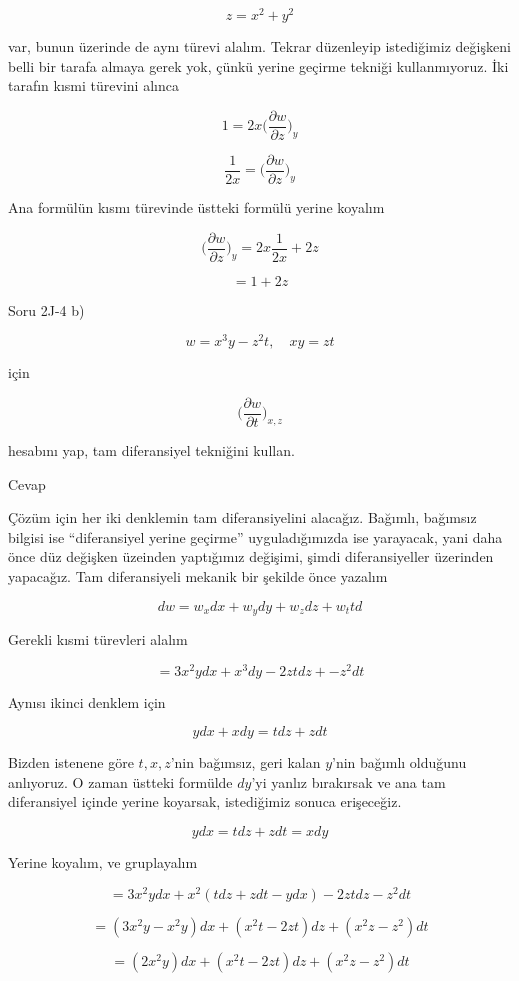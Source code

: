 \documentclass[12pt,fleqn]{article}\usepackage{../../common}
\begin{document}
$$ z = x^2 + y^2 $$

var, bunun üzerinde de aynı türevi alalım. Tekrar düzenleyip istediğimiz
değişkeni belli bir tarafa almaya gerek yok, çünkü yerine geçirme tekniği
kullanmıyoruz. İki tarafın kısmi türevini alınca

$$ 1 = 2x  \bigg( \frac{\partial w}{\partial z}  \bigg)_y  $$

$$ \frac{ 1}{2x}  = \bigg( \frac{\partial w}{\partial z}  \bigg)_y  $$

Ana formülün kısmı türevinde üstteki formülü yerine koyalım

$$
\bigg( \frac{\partial w}{\partial z}  \bigg)_y  =
2x  \frac{1}{2x}  + 2z
$$

$$   =
1 + 2z
$$

Soru 2J-4 b)

$$ w = x^3y - z^2t, \quad xy = zt$$

için

$$ \bigg( \frac{\partial w}{\partial t}  \bigg)_{x,z}  $$

hesabını yap, tam diferansiyel tekniğini kullan. 

Cevap

Çözüm için her iki denklemin tam diferansiyelini alacağız. Bağımlı,
bağımsız bilgisi ise ``diferansiyel yerine geçirme'' uyguladığımızda ise
yarayacak, yani daha önce düz değişken üzeinden yaptığımız değişimi, şimdi
diferansiyeller üzerinden yapacağız. Tam diferansiyeli mekanik bir şekilde
önce yazalım

$$ dw = w_x dx + w_y dy + w_z dz + w_t td $$

Gerekli kısmi türevleri alalım

$$ = 3x^2y dx + x^3dy - 2zt dz + -z^2 dt$$

Aynısı ikinci denklem için 

$$ y dx + x dy = t dz + z dt $$

Bizden istenene göre $t,x,z$'nin bağımsız, geri kalan $y$'nin bağımlı
olduğunu anlıyoruz. O zaman üstteki formülde $dy$'yi yanlız bırakırsak ve
ana tam diferansiyel içinde yerine koyarsak, istediğimiz sonuca
erişeceğiz. 

$$ y dx  = t dz + z dt = x dy$$

Yerine koyalım, ve gruplayalım

$$ = 3x^2ydx + x^2(tdz + zdt - ydx) - 2ztdz - z^2dt $$

$$ = (3x^2y  - x^2y)dx + (x^2t-2zt)dz + (x^2z-z^2)dt  $$

$$ = (2x^2y) dx + (x^2t-2zt) dz + (x^2z-z^2)dt  $$
\end{document}
